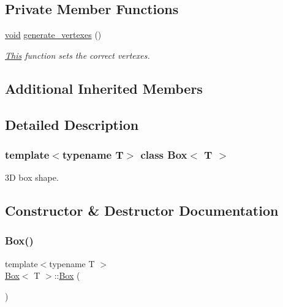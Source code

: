 \subsection*{Private Member Functions}
\begin{DoxyCompactItemize}
\item 
\mbox{\hyperlink{glad_8h_a950fc91edb4504f62f1c577bf4727c29}{void}} \mbox{\hyperlink{classBox_a7f7b061bf913f9ab47bff75536bc137d}{generate\+\_\+vertexes}} ()
\begin{DoxyCompactList}\small\item\em \mbox{\hyperlink{classThis}{This}} function sets the correct vertexes. \end{DoxyCompactList}\end{DoxyCompactItemize}
\subsection*{Additional Inherited Members}


\subsection{Detailed Description}
\subsubsection*{template$<$typename T$>$\newline
class Box$<$ T $>$}

3D box shape. 

\subsection{Constructor \& Destructor Documentation}
\mbox{\label{classBox_a057f84d8fa68647c6484d4e004d8ab74}} 
\subsubsection{\texorpdfstring{Box()}{Box()}\hspace{0.1cm}{\footnotesize\ttfamily [1/3]}}
{\footnotesize\ttfamily template$<$typename T $>$ \\
\mbox{\hyperlink{classBox}{Box}}$<$ T $>$\+::\mbox{\hyperlink{classBox}{Box}} (\begin{DoxyParamCaption}{ }\end{DoxyParamCaption})}



